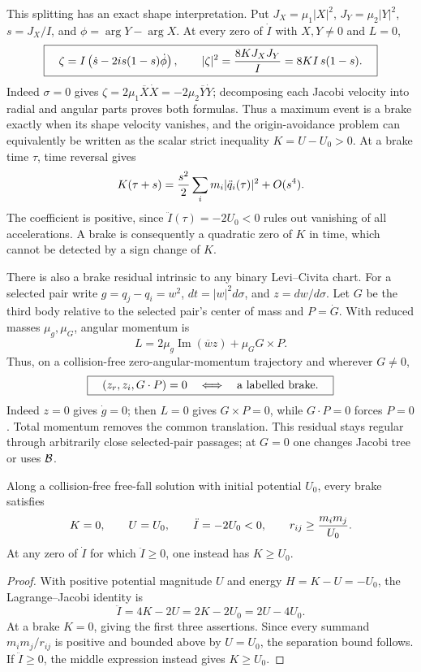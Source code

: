 This splitting has an exact shape interpretation.  Put
$J_X=\mu_1|X|^2$, $J_Y=\mu_2|Y|^2$, $s=J_X/I$, and
$\phi=\arg Y-\arg X$.  At every zero of $\dot I$ with $X,Y\ne0$ and $L=0$,
\[
 \boxed{\quad
 \zeta=I\left(\dot s-2is(1-s)\dot\phi\right),\qquad
 |\zeta|^2={8KJ_XJ_Y\over I}=8KI\,s(1-s).
 \quad}
\]
Indeed $\sigma=0$ gives
$\zeta=2\mu_1\overline X\dot X=-2\mu_2\overline Y\dot Y$; decomposing each
Jacobi velocity into radial and angular parts proves both formulas.  Thus a
maximum event is a brake exactly when its shape velocity vanishes, and the
origin-avoidance problem can equivalently be written as the scalar strict
inequality $K=U-U_0>0$. At a brake time $\tau$, time reversal gives
\[
 K(\tau+s)={s^2\over2}\sum_i m_i|\ddot q_i(\tau)|^2+O(s^4).
\]
The coefficient is positive, since $\ddot I(\tau)=-2U_0<0$ rules out
vanishing of all accelerations. A brake is consequently a quadratic zero
of $K$ in time, which cannot be detected by a sign change of $K$.

There is also a brake residual intrinsic to any binary Levi--Civita chart.
For a selected pair write $g=q_j-q_i=w^2$, $dt=|w|^2d\sigma$, and
$z=dw/d\sigma$. Let $G$ be the third body relative to the selected pair's
center of mass and $P=\dot G$. With reduced masses $\mu_g,\mu_G$, angular
momentum is
\[
 L=2\mu_g\operatorname{Im}(\overline w z)+\mu_G G\times P.
\]
Thus, on a collision-free zero-angular-momentum trajectory and wherever
$G\ne0$,
\[
 \boxed{\quad (z_r,z_i,G\cdot P)=0
 \quad\Longleftrightarrow\quad\hbox{a labelled brake}.\quad}
\]
Indeed $z=0$ gives $\dot g=0$; then $L=0$ gives $G\times P=0$, while
$G\cdot P=0$ forces $P=0$. Total momentum removes the common translation.
This residual stays regular through arbitrarily close selected-pair
passages; at $G=0$ one changes Jacobi tree or uses $\mathcal B$.

\begin{theorem}
Along a collision-free free-fall solution with initial potential $U_0$, every
brake satisfies
\[
 K=0,\qquad U=U_0,\qquad \ddot I=-2U_0<0,
 \qquad r_{ij}\geq {m_im_j\over U_0}.
\]
At any zero of $\dot I$ for which $\ddot I\geq0$, one instead has
$K\geq U_0$.
\end{theorem}
\begin{proof}
With positive potential magnitude $U$ and energy $H=K-U=-U_0$, the
Lagrange--Jacobi identity is
\[
 \ddot I=4K-2U=2K-2U_0=2U-4U_0.
\]
At a brake $K=0$, giving the first three assertions.  Since every summand
$m_im_j/r_{ij}$ is positive and bounded above by $U=U_0$, the separation
bound follows.  If $\ddot I\geq0$, the middle expression instead gives
$K\geq U_0$.
\end{proof}

